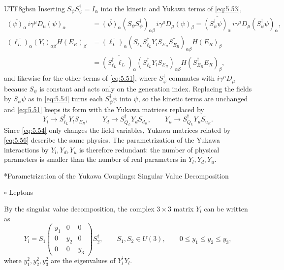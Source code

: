 \documentclass[11pt,a4paper,oneside]{report}
\makeatletter
\newcommand\topic{\@startsection{paragraph}{4}{\z@}{-1.7ex plus -.3ex}{.5ex}{\normalfont\normalsize\bfseries\itshape\boldmath}*}
\newcommand\divtitle[1]{\par\addvspace{1.1ex}\noindent
  {\normalfont\normalsize #1}\par\nobreak\vspace{.35ex}\@afterindentfalse\@afterheading}
\newenvironment{qftinset}{\begin{list}{}{\setlength{\leftmargin}{2em}\setlength{\rightmargin}{0pt}\setlength{\listparindent}{\parindent}}\item[]}{\end{list}}
\makeatother
\begin{document}
\begin{CJK*}{UTF8}{gbsn}
Inserting $S_\psi S_\psi^\dagger=I_\alpha$ into the kinetic and Yukawa terms of \eqref{eq:5.53},
\begin{equation*}
\begin{aligned}
\overline{(\psi)_\alpha}\,i\gamma^\mu D_\mu(\psi)_\alpha
&=\overline{(\psi)_\alpha}(S_\psi S_\psi^\dagger)_{\alpha\beta}\,i\gamma^\mu D_\mu(\psi)_\beta
=\overline{(S_\psi^\dagger\psi)_\alpha}\,i\gamma^\mu D_\mu(S_\psi^\dagger\psi)_\alpha,\\
\overline{(\ell_L)_\alpha}(Y_l)_{\alpha\beta}H(E_R)_\beta
&=\overline{(\ell_L)_\alpha}(S_{\ell_L}S_{\ell_L}^\dagger Y_lS_{E_R}S_{E_R}^\dagger)_{\alpha\beta}H(E_R)_\beta\\
&=\overline{(S_{\ell_L}^\dagger\ell_L)_\alpha}(S_{\ell_L}^\dagger Y_lS_{E_R})_{\alpha\beta}H(S_{E_R}^\dagger E_R)_\beta,
\end{aligned}
\tag{5.55}\label{eq:5.55}
\end{equation*}
and likewise for the other terms of \eqref{eq:5.51}, where $S_\psi^\dagger$ commutes with $i\gamma^\mu D_\mu$ because $S_\psi$ is constant and acts only on the generation index. Replacing the fields by $S_\psi\psi$ as in \eqref{eq:5.54} turns each $S_\psi^\dagger\psi$ into $\psi$, so the kinetic terms are unchanged and \eqref{eq:5.51} keeps its form with the Yukawa matrices replaced by
\begin{equation*}
Y_l\to S_{\ell_L}^\dagger Y_lS_{E_R},\qquad Y_d\to S_{Q_L}^\dagger Y_dS_{d_R},\qquad Y_u\to S_{Q_L}^\dagger Y_uS_{u_R} .
\tag{5.56}\label{eq:5.56}
\end{equation*}
Since \eqref{eq:5.54} only changes the field variables, Yukawa matrices related by \eqref{eq:5.56} describe the same physics. The parametrization of the Yukawa interactions by $Y_l,Y_d,Y_u$ is therefore redundant: the number of physical parameters is smaller than the number of real parameters in $Y_l,Y_d,Y_u$.

\topic{Parametrization of the Yukawa Couplings: Singular Value Decomposition}

\begin{qftinset}

\divtitle{$\circ$ Leptons}

By the singular value decomposition, the complex $3\times3$ matrix $Y_l$ can be written as
\begin{equation*}
Y_l=S_1\begin{pmatrix}y_1&0&0\\0&y_2&0\\0&0&y_3\end{pmatrix}S_2^\dagger,\qquad S_1,S_2\in U(3),\qquad 0\le y_1\le y_2\le y_3,
\tag{5.57}\label{eq:5.57}
\end{equation*}
where $y_1^2,y_2^2,y_3^2$ are the eigenvalues of $Y_l^\dagger Y_l$.
\begin{itemize}



\end{itemize}
\end{qftinset}
\end{CJK*}
\end{document}
